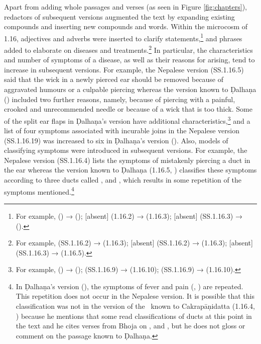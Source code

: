 Apart from adding whole passages and verses (as seen in Figure \ref{fig:chapters}),
redactors of subsequent versions augmented the text by expanding existing
compounds and inserting new compounds and words. Within the microcosm of 1.16,
adjectives and adverbs were inserted to clarify statements,\footnote{For example,
     () → 
    (); [absent] (1.16.2) →  (1.16.3); 
    [absent] (SS.1.16.3) →  ().} and phrases added to
    elaborate on diseases and treatments.\footnote{For example, 
        (SS.1.16.2) →  (1.16.3); [absent] (SS.1.16.2) →
         (1.16.3);  [absent] (SS.1.16.3) →
         (1.16.5).} In particular, the characteristics and
        number of symptoms of a disease, as well as their reasons for arising, tend to
        increase in subsequent versions. For example, the Nepalese version (SS.1.16.5)
        said that the wick in a newly pierced ear should be removed because of aggravated
        humours or a culpable piercing whereas the version known to Ḍalhaṇa 
        () included two further reasons, namely, because of piercing with
        a painful, crooked and unrecommended needle or because of a wick that is too
        thick. Some of the split ear flaps in Ḍalhaṇa's version have additional
        characteristics,\footnote{For example, 
            () →  ();  
            (SS.1.16.9)
            →  (1.16.10); 
            (SS.1.16.9) →  (1.16.10).} and a list of four symptoms
            associated with incurable joins in the Nepalese version (SS.1.16.19) was increased
            to six in Ḍalhaṇa's version (). Also, models of
            classifying symptoms were introduced in subsequent versions. For example, the
            Nepalese version (SS.1.16.4) lists the symptoms of mistakenly piercing a duct in
            the ear whereas the version known to Ḍalhaṇa (1.16.5, \cite[76–77]{vulgate})
            classifies these symptoms according to three ducts called ,
             and , which results in some repetition of the
            symptoms mentioned.\footnote{In Ḍalhaṇa's version  (), 
            the
                symptoms of fever and pain (, ) are repeated. This 
                repetition
                does not occur in the Nepalese version. It is possible that this classification
                was not in the version of the \SS\ known to Cakrapāṇidatta (1.16.4,
                \cite[126]{acar-1939}) because he mentions that some read classifications of ducts
                at this point in the text and he cites verses from Bhoja on ,
                 and , but he does not gloss or comment on the
                passage known to Ḍalhaṇa.}

